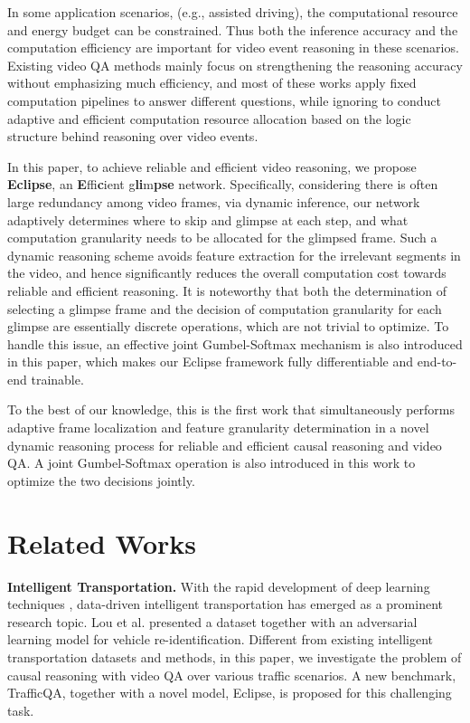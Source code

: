\documentclass[final]{cvpr}
\begin{document}
In some application scenarios, (e.g., assisted driving), the computational resource and energy budget can be constrained.
Thus 
both the inference accuracy and the computation efficiency are important for video event reasoning in these scenarios.
Existing video QA methods \cite{Kim_2020_CVPR,Le_2020_CVPR,lei-etal-2020-tvqa} mainly focus on strengthening the reasoning accuracy without emphasizing much efficiency, and most of
these works apply fixed computation pipelines 
to answer different questions, while ignoring to conduct adaptive and efficient computation resource allocation based on the logic structure behind reasoning over video events. 




In this paper, to achieve reliable and efficient video reasoning, we propose \textbf{Eclipse}, an \textbf{E}ffi\textbf{c}ient g\textbf{li}m\textbf{pse} network.
Specifically, considering there is often large redundancy among video frames, via dynamic inference, our network adaptively determines where to skip and glimpse at each step, and what computation granularity needs to be allocated for the glimpsed frame. Such a dynamic reasoning scheme avoids feature extraction for the irrelevant segments in the video, and hence significantly reduces the overall computation cost towards 
reliable and efficient reasoning.
It is noteworthy that both the determination of selecting a glimpse frame and the decision of computation granularity for each glimpse are essentially discrete operations, which are 
not trivial to optimize. To handle this issue, an effective joint Gumbel-Softmax mechanism is also introduced in this paper, which makes our Eclipse framework fully differentiable and end-to-end trainable. 

To the best of our knowledge, this is the first work that simultaneously performs adaptive frame localization and feature granularity determination in a novel dynamic reasoning process for reliable and efficient causal reasoning and video QA. A joint Gumbel-Softmax operation is also introduced in this work to optimize the two decisions jointly.




\section{Related Works}
\textbf{Intelligent Transportation.} 
With the rapid development of deep learning techniques \cite{krizhevsky2012imagenet, ren2015faster, vaswani2017attention}, data-driven intelligent transportation \cite{chandra2020forecasting,lou2019veri,you2020traffic,chandra2020forecasting} has emerged as a prominent research topic.
Lou et al. \cite{lou2019veri} presented a dataset together with an adversarial learning model for vehicle re-identification.
Different from existing intelligent transportation datasets and methods,
in this paper, we investigate the problem of causal reasoning with video QA over various traffic scenarios. A new benchmark, TrafficQA, together with a novel model, Eclipse, is proposed for this challenging task.
\end{document}
